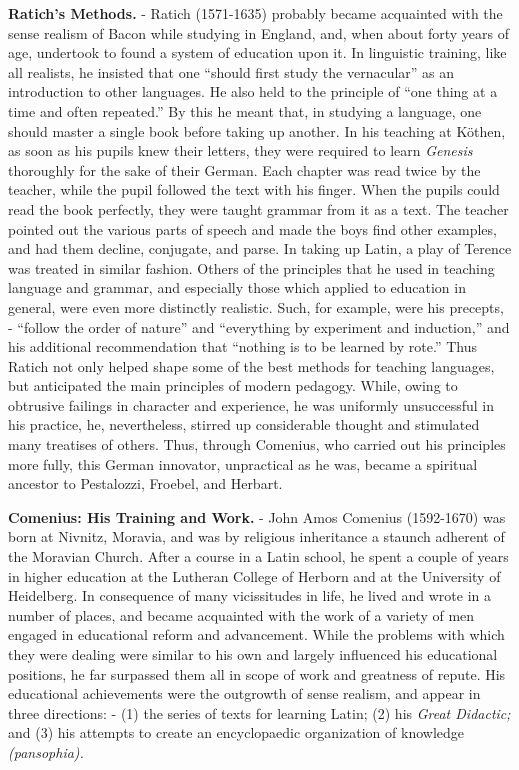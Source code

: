 \documentclass[
]{book}
\begin{document}
\textbf{Ratich's Methods.} - Ratich (1571-1635) probably became acquainted with the sense realism of Bacon while studying in England, and, when about forty years of age, undertook to found a system of education upon it. In linguistic training, like all realists, he insisted that one ``should first study the vernacular'' as an introduction to other languages. He also held to the principle of ``one thing at a time and often repeated.'' By this he meant that, in studying a language, one should master a single book before taking up another. In his teaching at Köthen, as soon as his pupils knew their letters, they were required to learn \emph{Genesis} thoroughly for the sake of their German. Each chapter was read twice by the teacher, while the pupil followed the text with his finger. When the pupils could read the book perfectly, they were taught grammar from it as a text. The teacher pointed out the various parts of speech and made the boys find other examples, and had them decline, conjugate, and parse. In taking up Latin, a play of Terence was treated in similar fashion. Others of the principles that he used in teaching language and grammar, and especially those which applied to education in general, were even more distinctly realistic. Such, for example, were his precepts, - ``follow the order of nature'' and ``everything by experiment and induction,'' and his additional recommendation that ``nothing is to be learned by rote.'' Thus Ratich not only helped shape some of the best methods for teaching languages, but anticipated the main principles of modern pedagogy. While, owing to obtrusive failings in character and experience, he was uniformly unsuccessful in his practice, he, nevertheless, stirred up considerable thought and stimulated many treatises of others. Thus, through Comenius, who carried out his principles more fully, this German innovator, unpractical as he was, became a spiritual ancestor to Pestalozzi, Froebel, and Herbart.

\textbf{Comenius: His Training and Work.} - John Amos Comenius (1592-1670) was born at Nivnitz, Moravia, and was by religious inheritance a staunch adherent of the Moravian Church. After a course in a Latin school, he spent a couple of years in higher education at the Lutheran College of Herborn and at the University of Heidelberg. In consequence of many vicissitudes in life, he lived and wrote in a number of places, and became acquainted with the work of a variety of men engaged in educational reform and advancement. While the problems with which they were dealing were similar to his own and largely influenced his educational positions, he far surpassed them all in scope of work and greatness of repute. His educational achievements were the outgrowth of sense realism, and appear in three directions: - (1) the series of texts for learning Latin; (2) his \emph{Great Didactic;} and (3) his attempts to create an encyclopaedic organization of knowledge \emph{(pansophia).}
\end{document}
